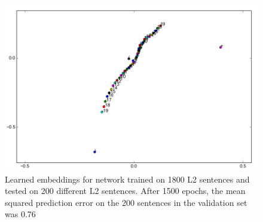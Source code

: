 \documentclass{article}
\begin{document}
\begin{figure}
        \includegraphics[scale=0.5]{L2_embeddings2.png}
    \caption{Learned embeddings for network trained on 1800 L2 sentences and tested on 200 different L2 sentences. After 1500 epochs, the mean squared prediction error on the 200 sentences in the validation set was 0.76}
\end{figure}
\end{document}
